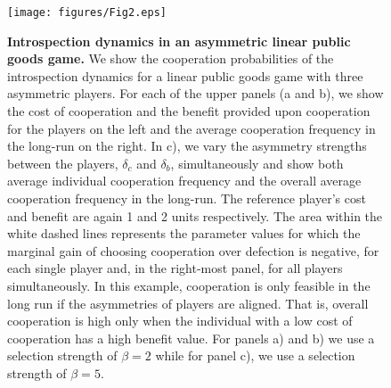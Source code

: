 \documentclass[11pt]{article}
\theoremstyle{plainCl1}
\theoremstyle{plainCl2}
\begin{document}
\clearpage
\begin{figure}
\centering
\texttt{[image: figures/Fig2.eps]}~\\[0.4cm]
\caption{\onehalfspacing
\textbf{Introspection dynamics in an asymmetric linear public goods game.} We show the cooperation probabilities of the introspection dynamics for a linear public goods game with three asymmetric players. For each of the upper panels (a and b), we show the cost of cooperation and the benefit provided upon cooperation for the players on the left and the average cooperation frequency in the long-run on the right. %
In c), we vary the asymmetry strengths between the players, $\delta_c $ and $\delta_b$, simultaneously and show both average individual cooperation frequency and the overall average cooperation frequency in the long-run. The reference player's cost and benefit are again 1 and 2 units respectively. The area within the white dashed lines represents the parameter values for which the marginal gain of choosing cooperation over defection is negative, for each single player and, in the right-most panel, for all players simultaneously. In this example, cooperation is only feasible in the long run if the asymmetries of players are aligned. That is, overall cooperation is high only when the individual with a low cost of cooperation has a high benefit value. For panels a) and b) we use a selection strength of $\beta = 2$ while for panel c), we use a selection strength of $\beta = 5$. 
}
\label{Fig:LPGG-asymmetric}
\end{figure}
\clearpage
\end{document}
